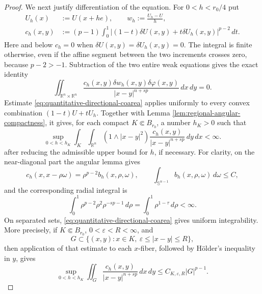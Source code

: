 \documentclass[10pt,a4paper]{amsart}
\newcommand{\R}{\mathbb R}
\newcommand{\dd}{\,d}
\begin{document}
\begin{proof}
We next justify differentiation of the equation.  For $0<h<r_0/4$ put
\begin{align*}
 U_h(x)&:=U(x+he),\qquad w_h:=\frac{U_h-U}{h},\\
 c_h(x,y)&:=(p-1)\int_0^1
 |(1-t)\delta U(x,y)+t\delta U_h(x,y)|^{p-2}\dd t.
\end{align*}
Here and below \(c_h=0\) when
\(\delta U(x,y)=\delta U_h(x,y)=0\).  The integral is finite otherwise,
even if the affine segment between the two increments crosses zero,
because \(p-2>-1\).
Subtraction of the two entire weak equations gives the exact identity
\begin{equation}
 \iint_{\R^n\times\R^n}
 \frac{c_h(x,y)\delta w_h(x,y)\delta\varphi(x,y)}
 {|x-y|^{n+sp}}\dd x\!\dd y=0.
 \label{eq:exact-secant-linear-equation}
\end{equation}
Estimate \eqref{eq:quantitative-directional-coarea} applies uniformly
to every convex combination \((1-t)U+tU_h\).  Together with Lemma
\ref{lem:regional-angular-compactness}, it gives, for each compact
\(K\Subset B_{r_0}\), a number \(h_K>0\) such that
\begin{equation}
 \sup_{0<h<h_K}
 \int_K\int_{\R^n}(1\wedge|x-y|^2)
 \frac{c_h(x,y)}{|x-y|^{n+sp}}\dd y\!\dd x<\infty.
 \label{eq:averaged-secant-levy-bound}
\end{equation}
after reducing the admissible upper bound for \(h\), if necessary.
For clarity, on the near-diagonal part the angular lemma gives
\[
 c_h(x,x-\rho\omega)=\rho^{p-2}b_h(x,\rho,\omega),
 \qquad
 \int_{\mathbb S^{n-1}}b_h(x,\rho,\omega)\dd\omega\le C,
\]
and the corresponding radial integral is
\[
 \int_0^1\rho^{p-2}\rho^2\rho^{-sp-1}\dd\rho
 =\int_0^1\rho^{1-\tau}\dd\rho<\infty.
\]
On separated sets,
\eqref{eq:quantitative-directional-coarea} gives uniform
integrability.  More precisely, if \(K\Subset B_{r_0}\),
\(0<\varepsilon<R<\infty\), and
\[
 G\subset\{(x,y):x\in K,\ \varepsilon\le|x-y|\le R\},
\]
then application of that estimate to each \(x\)-fiber, followed by
H\"older's inequality in \(y\), gives
\begin{equation}
 \sup_{0<h<h_K}\iint_G
 \frac{c_h(x,y)}{|x-y|^{n+sp}}\dd x\!\dd y
 \le C_{K,\varepsilon,R}|G|^{p-1}.
 \label{eq:separated-secant-uniform-integrability}
\end{equation}


\end{proof}
\end{document}
